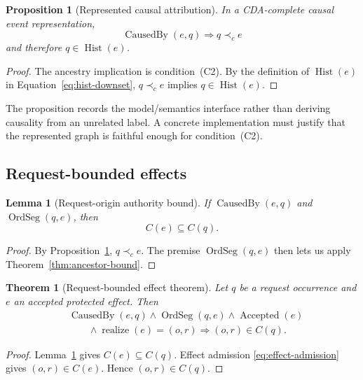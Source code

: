 \documentclass[10pt,twocolumn]{article}
\newcommand{\CausedBy}{\operatorname{CausedBy}}
\newcommand{\Realize}{\operatorname{realize}}
\newcommand{\Accepted}{\operatorname{Accepted}}
\newcommand{\hb}{\prec_{c}}
\newcommand{\Hist}{\operatorname{Hist}}
\newcommand{\OrdSeg}{\operatorname{OrdSeg}}
\newtheorem{theorem}{Theorem}
\newtheorem{proposition}{Proposition}
\newtheorem{lemma}{Lemma}
\begin{document}
\begin{proposition}[Represented causal attribution]
\label{thm:derived-ca}
In a CDA-complete causal event representation,
\begin{equation}
  \CausedBy(e,q)\Longrightarrow q\hb e
\end{equation}
and therefore $q\in\Hist(e)$.
\end{proposition}

\begin{proof}
The ancestry implication is condition~(C2).  By the definition of $\Hist(e)$
in Equation~\eqref{eq:hist-downset}, $q\hb e$ implies $q\in\Hist(e)$.
\end{proof}

The proposition records the model/semantics interface rather than deriving
causality from an unrelated label.  A concrete implementation must justify
that the represented graph is faithful enough for condition~(C2).

\subsection{Request-bounded effects}

\begin{lemma}[Request-origin authority bound]
\label{lem:req-bound}
If $\CausedBy(e,q)$ and $\OrdSeg(q,e)$, then
\begin{equation}
  C(e)\subseteq C(q).
\end{equation}
\end{lemma}

\begin{proof}
By Proposition~\ref{thm:derived-ca}, $q\hb e$.  The premise $\OrdSeg(q,e)$
then lets us apply Theorem~\ref{thm:ancestor-bound}.
\end{proof}

\begin{theorem}[Request-bounded effect theorem]
\label{thm:req-effect}
Let $q$ be a request occurrence and $e$ an accepted protected effect.  Then
\begin{equation}
\begin{aligned}
  &\CausedBy(e,q)\land\OrdSeg(q,e)\land\Accepted(e)\\
  &\qquad\land\Realize(e)=(o,r)
  \Longrightarrow (o,r)\in C(q).
\end{aligned}
\label{eq:req-effect}
\end{equation}
\end{theorem}

\begin{proof}
Lemma~\ref{lem:req-bound} gives $C(e)\subseteq C(q)$.  Effect admission
\eqref{eq:effect-admission} gives $(o,r)\in C(e)$.  Hence $(o,r)\in C(q)$.
\end{proof}
\end{document}
